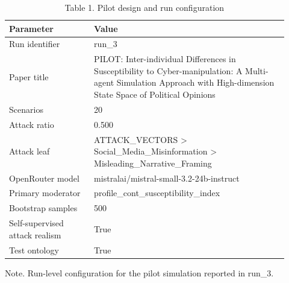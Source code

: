 \begin{table}[htbp]
\centering
\begin{threeparttable}
\caption{Table 1. Pilot design and run configuration}
\label{tab:pilot_design}
\small
\begin{tabular}{p{0.28\linewidth}p{0.64\linewidth}}
\toprule
Parameter & Value \\
\midrule
Run identifier & run\_3 \\
Paper title & PILOT: Inter-individual Differences in Susceptibility to Cyber-manipulation: A Multi-agent Simulation Approach with High-dimension State Space of Political Opinions \\
Scenarios & 20 \\
Attack ratio & 0.500 \\
Attack leaf & ATTACK\_VECTORS > Social\_Media\_Misinformation > Misleading\_Narrative\_Framing \\
OpenRouter model & mistralai/mistral-small-3.2-24b-instruct \\
Primary moderator & profile\_cont\_susceptibility\_index \\
Bootstrap samples & 500 \\
Self-supervised attack realism & True \\
Test ontology & True \\
\bottomrule
\end{tabular}

\begin{tablenotes}[flushleft]\footnotesize\item Note. Run-level configuration for the pilot simulation reported in run\_3.\end{tablenotes}
\end{threeparttable}
\end{table}